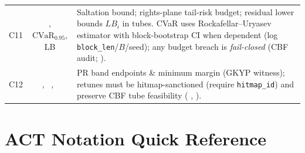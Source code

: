 \documentclass[10pt]{article}
\makeatletter
\newcommand{\JSGxref}[2]{%
  \@ifundefined{r@#2}{\textbf{[#1 ??]}}{#1~\ref{#2}}}
\newcommand{\secref}[1]{\JSGxref{§}{#1}}
\newcommand{\constref}[1]{%
  \@ifundefined{constsym#1}{\textbf{[C-#1 ??]}}{\csname constsym#1\endcsname}}
\makeatother
\begin{document}
\begin{center}
\begin{tabularx}{\textwidth}{@{} c >{}c<{} >{\raggedright\arraybackslash}X @{}}
C11 & \constref{salt}, $\mathrm{CVaR}_{0.95}$, LB &
Saltation bound; rights-plane tail-risk budget; residual lower bounds $LB_i$ in tubes. CVaR uses Rockafellar--Uryasev estimator with block-bootstrap CI when dependent (log \texttt{block\_len}/$B$/seed); any budget breach is \emph{fail-closed} (CBF audit; \secref{sec:jsg-layers}).\\
C12 & \constref{omegal},\ \constref{omegau},\ \constref{PRmargin} &
PR band endpoints \& minimum margin (GKYP witness); retunes must be hitmap-sanctioned (require \texttt{hitmap\_id}) and preserve CBF tube feasibility (\secref{sec:omega-contract}, \secref{sec:jsg-layers}).\\
\bottomrule
\end{tabularx}
\end{center}

\section*{ACT Notation Quick Reference}
\end{document}
